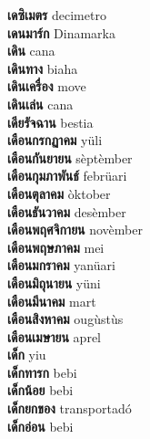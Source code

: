 \textbf{ เดซิเมตร  } decimetro \\
\textbf{ เดนมาร์ก  } Dinamarka \\
\textbf{ เดิน  } cana \\
\textbf{ เดินทาง  } biaha \\
\textbf{ เดินเครื่อง  } move \\
\textbf{ เดินเล่น  } cana \\
\textbf{ เดียรัจฉาน  } bestia \\
\textbf{ เดือนกรกฏาคม  } yüli \\
\textbf{ เดือนกันยายน  } sèptèmber \\
\textbf{ เดือนกุมภาพันธ์  } febrüari \\
\textbf{ เดือนตุลาคม  } òktober \\
\textbf{ เดือนธันวาคม  } desèmber \\
\textbf{ เดือนพฤศจิกายน  } novèmber \\
\textbf{ เดือนพฤษภาคม  } mei \\
\textbf{ เดือนมกราคม  } yanüari \\
\textbf{ เดือนมิถุนายน  } yüni \\
\textbf{ เดือนมีนาคม  } mart \\
\textbf{ เดือนสิงหาคม  } ougùstùs \\
\textbf{ เดือนเมษายน  } aprel \\
\textbf{ เด็ก  } yiu \\
\textbf{ เด็กทารก  } bebi \\
\textbf{ เด็กน้อย  } bebi \\
\textbf{ เด็กยกของ  } transportadó \\
\textbf{ เด็กอ่อน  } bebi \\
